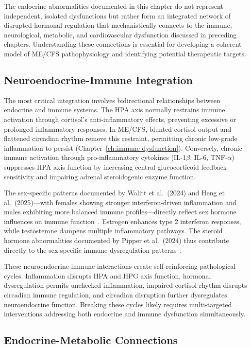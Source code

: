 The endocrine abnormalities documented in this chapter do not represent independent, isolated dysfunctions but rather form an integrated network of disrupted hormonal regulation that mechanistically connects to the immune, neurological, metabolic, and cardiovascular dysfunction discussed in preceding chapters. Understanding these connections is essential for developing a coherent model of ME/CFS pathophysiology and identifying potential therapeutic targets.

\subsection{Neuroendocrine-Immune Integration}

The most critical integration involves bidirectional relationships between endocrine and immune systems. The HPA axis normally restrains immune activation through cortisol's anti-inflammatory effects, preventing excessive or prolonged inflammatory responses. In ME/CFS, blunted cortisol output and flattened circadian rhythm remove this restraint, permitting chronic low-grade inflammation to persist (Chapter~\ref{ch:immune-dysfunction}). Conversely, chronic immune activation through pro-inflammatory cytokines (IL-1$\beta$, IL-6, TNF-$\alpha$) suppresses HPA axis function by increasing central glucocorticoid feedback sensitivity and impairing adrenal steroidogenic enzyme function.

The sex-specific patterns documented by Walitt et al.\ (2024) and Heng et al.\ (2025)---with females showing stronger interferon-driven inflammation and males exhibiting more balanced immune profiles---directly reflect sex hormone influences on immune function~\cite{walitt2024deep,heng2025sexspecific}. Estrogen enhances type 2 interferon responses, while testosterone dampens multiple inflammatory pathways. The steroid hormone abnormalities documented by Pipper et al.\ (2024) thus contribute directly to the sex-specific immune dysregulation patterns~\cite{pipper2024steroid}.

These neuroendocrine-immune interactions create self-reinforcing pathological cycles. Inflammation disrupts HPA and HPG axis function, hormonal dysregulation permits unchecked inflammation, impaired cortisol rhythm disrupts circadian immune regulation, and circadian disruption further dysregulates neuroendocrine function. Breaking these cycles likely requires multi-targeted interventions addressing both endocrine and immune dysfunction simultaneously.

\subsection{Endocrine-Metabolic Connections}

